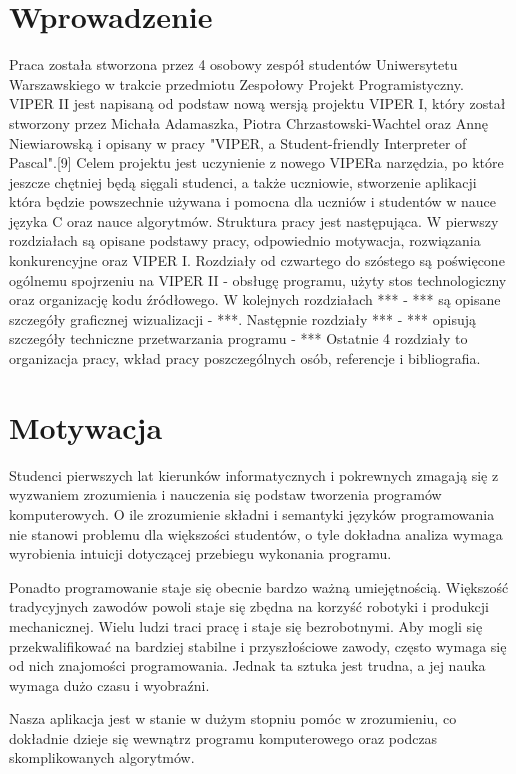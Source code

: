 \documentclass[a4paper,twoside,openright,11pt]{report}
\begin{document}
  \tableofcontents

  \chapter*{Wprowadzenie}
Praca została stworzona przez 4 osobowy zespół studentów Uniwersytetu Warszawskiego w trakcie przedmiotu Zespołowy Projekt Programistyczny. VIPER II jest napisaną od podstaw nową wersją projektu VIPER I, który został stworzony przez Michała Adamaszka, Piotra Chrzastowski-Wachtel oraz Annę Niewiarowską i opisany w pracy "VIPER, a Student-friendly Interpreter of Pascal".[9]  Celem projektu jest uczynienie z nowego VIPERa narzędzia, po które jeszcze chętniej będą sięgali studenci, a także uczniowie, stworzenie aplikacji która będzie powszechnie używana i pomocna dla uczniów i studentów w nauce języka C oraz nauce algorytmów. 
Struktura pracy jest następująca. W pierwszy rozdziałach są opisane podstawy pracy, odpowiednio motywacja, rozwiązania konkurencyjne oraz VIPER I. Rozdziały od czwartego do szóstego są poświęcone ogólnemu spojrzeniu na VIPER II - obsługę programu, użyty stos technologiczny oraz organizację kodu źródłowego. W kolejnych rozdziałach *** - *** są opisane szczegóły graficznej wizualizacji - ***. Następnie rozdziały *** - *** opisują szczegóły techniczne przetwarzania programu - *** Ostatnie 4 rozdziały to organizacja pracy, wkład pracy poszczególnych osób, referencje i bibliografia.

  \chapter{Motywacja}
\par Studenci pierwszych lat kierunków informatycznych i pokrewnych zmagają się z wyzwaniem zrozumienia i nauczenia się podstaw tworzenia programów komputerowych. O ile zrozumienie składni i semantyki języków programowania nie stanowi problemu dla większości studentów, o tyle dokładna analiza wymaga wyrobienia intuicji dotyczącej przebiegu wykonania programu.
\par Ponadto programowanie staje się obecnie bardzo ważną umiejętnością. Większość tradycyjnych zawodów powoli staje się zbędna na korzyść robotyki i produkcji mechanicznej. Wielu ludzi traci pracę i staje się bezrobotnymi. Aby mogli się przekwalifikować na bardziej stabilne i przyszłościowe zawody, często wymaga się od nich znajomości programowania. Jednak ta sztuka jest trudna, a jej nauka wymaga dużo czasu i wyobraźni. 
\par Nasza aplikacja jest w stanie w dużym stopniu pomóc w zrozumieniu, co dokładnie dzieje się wewnątrz programu komputerowego oraz podczas skomplikowanych algorytmów. 
\end{document}
